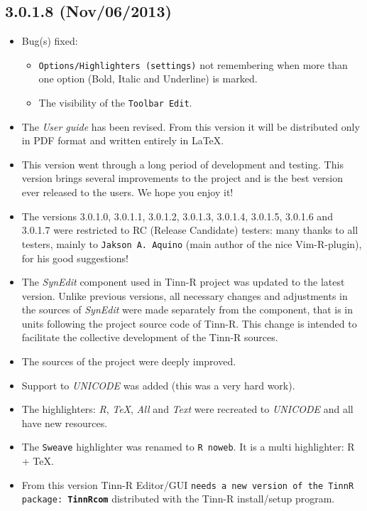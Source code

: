 \subsection*{3.0.1.8 (Nov/06/2013)}
\begin{itemize}
  \item Bug(s) fixed:
    \begin{itemize}
      \item \texttt{Options/Highlighters (settings)} not remembering when more than
       one option (Bold, Italic and Underline) is marked.
      \item The visibility of the \texttt{Toolbar Edit}.
    \end{itemize}
  \item The \textit{User guide} has been revised. From this version it will be distributed
   only in PDF format and written entirely in \LaTeX.
  \item This version went through a long period of development and testing.
   This version brings several improvements to the project and is the
   best version ever released to the users. We hope you enjoy it!
  \item The versions 3.0.1.0, 3.0.1.1, 3.0.1.2, 3.0.1.3, 3.0.1.4, 3.0.1.5, 3.0.1.6 and 3.0.1.7
   were restricted to RC (Release Candidate) testers:
   many thanks to all testers, mainly to \texttt{Jakson A. Aquino} (main author of the nice Vim-R-plugin),
   for his good suggestions!
  \item The \textit{SynEdit} component used in Tinn-R project was updated to the latest version.
   Unlike previous versions, all necessary changes and adjustments in the sources of \textit{SynEdit}
   were made separately from the component, that is in units following the project source code of Tinn-R.
   This change is intended to facilitate the collective development of the Tinn-R sources.
  \item The sources of the project were deeply improved.
  \item Support to \textit{UNICODE} was added (this was a very hard work).
  \item The highlighters: \textit{R}, \textit{TeX}, \textit{All} and \textit{Text} were
   recreated to \textit{UNICODE} and all have new resources.
  \item The \texttt{Sweave} highlighter was renamed to \texttt{R noweb}. It is a multi highlighter: R + TeX.
  \item From this version Tinn-R Editor/GUI \texttt{needs a new version of the TinnR package:
   \textbf{TinnRcom}} distributed with the Tinn-R install/setup program.

\end{itemize}
